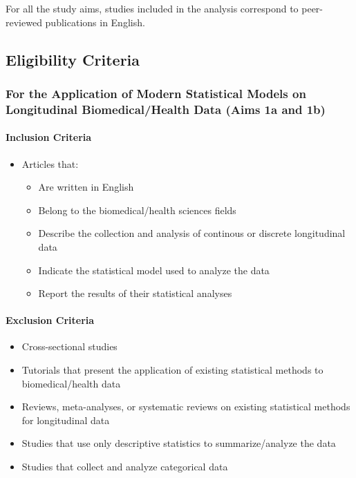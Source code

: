 \documentclass[
]{article}
\let\oldparagraph\paragraph
\renewcommand{\paragraph}[1]{\oldparagraph{#1}\mbox{}}
\begin{document}
For all the study aims, studies included in the analysis correspond to
peer-reviewed publications in English.

\hypertarget{eligibility-criteria}{%
\subsection{Eligibility Criteria}\label{eligibility-criteria}}

\hypertarget{for-the-application-of-modern-statistical-models-on-longitudinal-biomedicalhealth-data-aims-1a-and-1b}{%
\subsubsection{For the Application of Modern Statistical Models on
Longitudinal Biomedical/Health Data (Aims 1a and
1b)}\label{for-the-application-of-modern-statistical-models-on-longitudinal-biomedicalhealth-data-aims-1a-and-1b}}

\hypertarget{inclusion-criteria}{%
\paragraph{Inclusion Criteria}\label{inclusion-criteria}}

\begin{itemize}
\item
  Articles that:

  \begin{itemize}
  \item
    Are written in English
  \item
    Belong to the biomedical/health sciences fields
  \item
    Describe the collection and analysis of continous or discrete
    longitudinal data
  \item
    Indicate the statistical model used to analyze the data
  \item
    Report the results of their statistical analyses
  \end{itemize}
\end{itemize}

\hypertarget{exclusion-criteria}{%
\paragraph{Exclusion Criteria}\label{exclusion-criteria}}

\begin{itemize}
\item
  Cross-sectional studies
\item
  Tutorials that present the application of existing statistical methods
  to biomedical/health data
\item
  Reviews, meta-analyses, or systematic reviews on existing statistical
  methods for longitudinal data
\item
  Studies that use only descriptive statistics to summarize/analyze the
  data
\item
  Studies that collect and analyze categorical data
\end{itemize}
\end{document}
